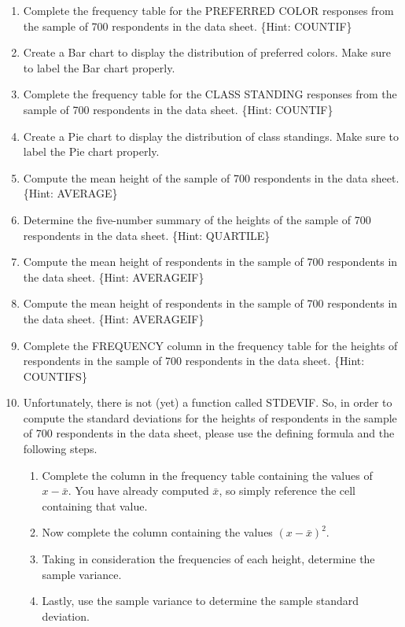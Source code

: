 \documentclass{article}
\begin{document}
\begin{enumerate}
	\item Complete the frequency table for the PREFERRED COLOR responses from the sample of 700 respondents in the data sheet. \{Hint: COUNTIF\} 
	\item Create a Bar chart to display the distribution of preferred colors. Make sure to label the Bar chart properly.
	\item Complete the frequency table for the CLASS STANDING responses from the sample of 700 respondents in the data sheet. \{Hint: COUNTIF\}
	\item Create a Pie chart to display the distribution of class standings. Make sure to label the Pie chart properly.
	\item Compute the mean height	 of the sample of 700 respondents in the data sheet. \{Hint: AVERAGE\}
	\item Determine the five-number summary of the heights of the sample of 700 respondents in the data sheet. \{Hint: QUARTILE\}
	\item Compute the mean height of  respondents in the sample of 700 respondents in the data sheet. \{Hint: AVERAGEIF\}
	\item Compute the mean height of  respondents in the sample of 700 respondents in the data sheet. \{Hint: AVERAGEIF\}
	\item Complete the FREQUENCY column in the frequency table for the heights of  respondents in the sample of 700 respondents in the data sheet. \{Hint: COUNTIFS\}
	\item Unfortunately, there is not (yet) a function called STDEVIF. So, in order to compute the standard deviations for the heights of  respondents in the sample of 700 respondents in the data sheet, please use the defining formula and the following steps.
	\begin{enumerate}
		\item Complete the column in the frequency table containing the values of $x-\bar{x}$. You have already computed $\bar{x}$, so simply reference the cell containing that value.
		\item Now complete the column containing the values $(x-\bar{x})^2$.
		\item Taking in consideration the frequencies of each height, determine the sample variance.
		\item Lastly, use the sample variance to determine the sample standard deviation.

\end{enumerate}
\end{enumerate}
\end{document}
